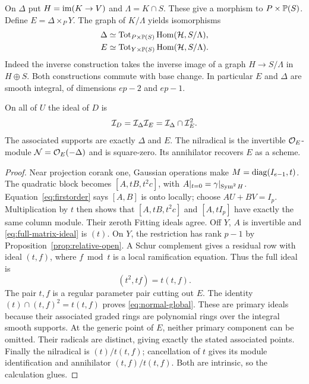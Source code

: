 On $\Delta$ put $H=\operatorname{im}(K\to V)$ and $\Lambda=K\cap S$.
These give a morphism to $P\times\mathbb P(S)$. Define
$E=\Delta\times_PY$. The graph of $K/\Lambda$ yields isomorphisms
\begin{align}
 \Delta&\simeq\operatorname{Tot}_{P\times\mathbb P(S)}\operatorname{Hom}(\mathcal H,S/\Lambda),
       \label{eq:graph-delta}\\
 E&\simeq\operatorname{Tot}_{Y\times\mathbb P(S)}\operatorname{Hom}(\mathcal H,S/\Lambda).
       \label{eq:graph-E}
\end{align}
Indeed the inverse construction takes the inverse image of a graph
$H\to S/\Lambda$ in $H\oplus S$. Both constructions commute with
base change. In particular $E$ and $\Delta$ are smooth integral,
of dimensions $ep-2$ and $ep-1$.

\begin{theorem}\label{thm:normal-form}
On all of $U$ the ideal of $D$ is
\begin{equation}\label{eq:normal-global}
 \mathcal I_D=\mathcal I_\Delta\mathcal I_E=\mathcal I_\Delta\cap\mathcal I_E^2.
\end{equation}
The associated supports are exactly $\Delta$ and $E$. The nilradical
is the invertible $\mathcal O_E$-module $\mathcal N=\mathcal O_E(-\Delta)$ and is
square-zero. Its annihilator recovers $E$ as a scheme.
\end{theorem}
\begin{proof}
Near projection corank one, Gaussian operations make
$M=\operatorname{diag}(I_{e-1},t)$. The quadratic block becomes
$[A,tB,t^2c]$, with $A|_{t=0}=\gamma|_{\operatorname{Sym}^2H}$.
Equation~\eqref{eq:firstorder} says $[A,B]$ is onto locally; choose
$AU+BV=I_p$. Multiplication by $t$ then shows that
$[A,tB,t^2c]$ and $[A,tI_p]$ have exactly the same column module.
Their zeroth Fitting ideals agree. Off $Y$, $A$ is invertible and
\eqref{eq:full-matrix-ideal} is $(t)$. On $Y$, the restriction has
rank $p-1$ by Proposition~\ref{prop:relative-open}. A Schur complement
gives a residual row with ideal $(t,f)$, where $f\bmod t$ is a local
ramification equation. Thus the full ideal is
\begin{equation}\label{eq:tf}
 (t^2,tf)=t(t,f).
\end{equation}
The pair $t,f$ is a regular parameter pair cutting out $E$.
The identity $(t)\cap(t,f)^2=t(t,f)$ proves
\eqref{eq:normal-global}. These are primary ideals because their
associated graded rings are polynomial rings over the integral smooth
supports. At the generic point of $E$, neither primary component can
be omitted. Their radicals are distinct, giving exactly the stated
associated points. Finally the nilradical is
$(t)/t(t,f)$; cancellation of $t$ gives its module identification and
annihilator $(t,f)/t(t,f)$. Both are intrinsic, so the calculation glues.
\end{proof}

